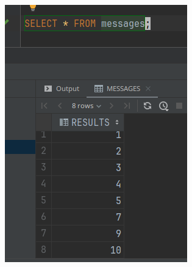 \documentclass[11pt]{article}
\begin{document}
\begin{center}
\includegraphics[width=.9\linewidth]{./resources/sall_messages.png}
\end{center}
\end{document}
